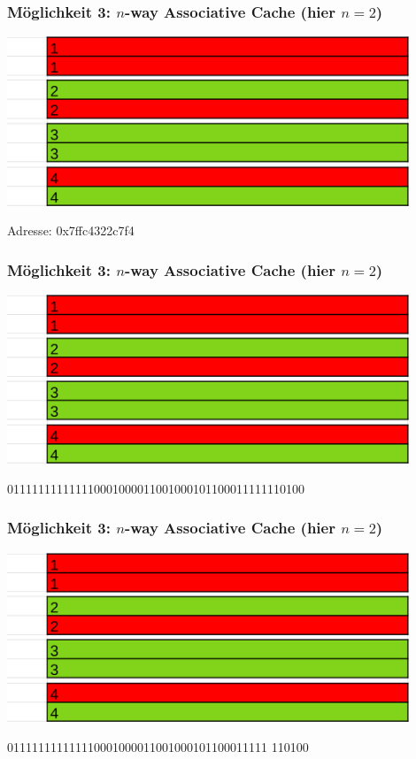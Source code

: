 \documentclass{beamer}
\begin{document}
%
%
\begin{frame}
\frametitle{M\"oglichkeit 3: $n$-way Associative Cache (hier $n=2$)}
\centerline{\includegraphics[width=12cm]{nac1.png}}
Adresse: 0x7ffc4322c7f4
\end{frame}

\begin{frame}
\frametitle{M\"oglichkeit 3: $n$-way Associative Cache (hier $n=2$)}
\centerline{\includegraphics[width=12cm]{nac1.png}}
011111111111110001000011001000101100011111110100
\end{frame}

\begin{frame}
\frametitle{M\"oglichkeit 3: $n$-way Associative Cache (hier $n=2$)}
\centerline{\includegraphics[width=12cm]{nac1.png}}
011111111111110001000011001000101100011111 {\color{orange}110100}
\end{frame}
\end{document}
